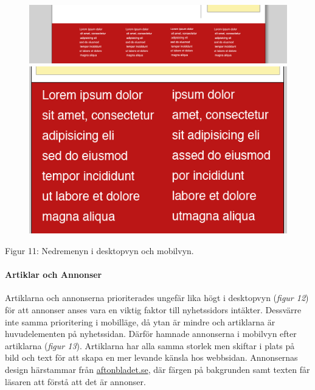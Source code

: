 \documentclass[11pt]{article}
\begin{document}
\begin{figure}[H]
\centerline{%
\includegraphics[scale=0.237]{pics/menydesktopbot.png}\hspace{2em}%
\includegraphics[scale=0.35]{pics/menymobilbot.png}%
}
\end{figure}
\hspace{0.5cm}Figur 11: Nedremenyn i desktopvyn och mobilvyn.
\newpage
\paragraph{Artiklar och Annonser}\mbox{}

Artiklarna och annonserna prioriterades ungefär lika högt i desktopvyn (\textit{figur 12}) för att annonser anses vara en viktig faktor till nyhetssidors intäkter. Dessvärre inte samma prioritering i mobilläge, då ytan är mindre och artiklarna är huvudelementen på nyhetssidan. Därför hamnade annonserna i mobilvyn efter artiklarna (\textit{figur 13}). Artiklarna har alla samma storlek men skiftar i plats på bild och text för att skapa en mer levande känsla hos webbsidan. Annonsernas design härstammar från \href{www.aftonbladet.se}{aftonbladet.se}, där färgen på bakgrunden samt texten får läsaren att förstå att det är annonser. 
\\
\end{document}

